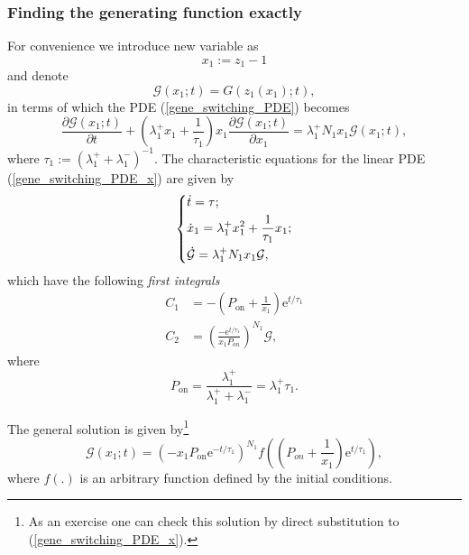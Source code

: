 \documentclass[a4paper, 11pt]{article}
\begin{document}
\subsubsection{Finding the generating function exactly}
For convenience we introduce new variable as
\begin{equation*}
  x_1 := z_1 - 1
\end{equation*}
and denote
\begin{equation*}
  \mathcal G(x_1; t) = G(z_1(x_1); t),
\end{equation*}
in terms of which the PDE (\ref{gene_switching_PDE}) becomes
\begin{equation} \label{gene_switching_PDE_x}
  \frac{\partial \mathcal G(x_1;t)}{\partial t} + (\lambda_1^+x_1 + \frac{1}{\tau_1})x_1\frac{\partial \mathcal G(x_1;t)}{\partial x_1} = \lambda_1^+N_1x_1\mathcal G(x_1;t),
\end{equation}
where $\tau_1 := (\lambda_1^+ + \lambda_1^-)^{-1}$.
The characteristic equations for the linear PDE (\ref{gene_switching_PDE_x}) are given by
\begin{equation*}
  \begin{dcases}
    \dot t = \tau;\\
    \dot x_1 = \lambda_1^+x_1^2 + \frac{1}{\tau_1}x_1;\\
    \dot{\mathcal G} = \lambda_1^+N_1x_1\mathcal G,
  \end{dcases}
\end{equation*}
which have the following {\it first integrals}
\begin{align*}
  C_1& = -\left(P_\text{on}+\frac{1}{x_1}\right)\mathrm e^{t/\tau_1}\\
  C_2& = \left(\frac{-\mathrm e^{t/\tau_1}}{x_1P_{on}}\right)^{N_1}\mathcal G,
\end{align*}
where
\begin{equation*}
  P_\text{on} = \frac{\lambda_1^+}{\lambda_1^+ + \lambda_1^-} = \lambda_1^+\tau_1.
\end{equation*}

The general solution is given by\footnote{As an exercise one can check this solution by direct substitution to (\ref{gene_switching_PDE_x}).}
\begin{equation}\label{n1_general_solution}
  \mathcal G(x_1;t) = \left(-x_1P_{\text{on}}\mathrm e^{-t/\tau_1}\right)^{N_1}f\left(\left(P_{on}+\frac{1}{x_1}\right)\mathrm e^{t/\tau_1}\right),
\end{equation}
where $f(.)$ is an arbitrary function defined by the initial conditions.
\end{document}
